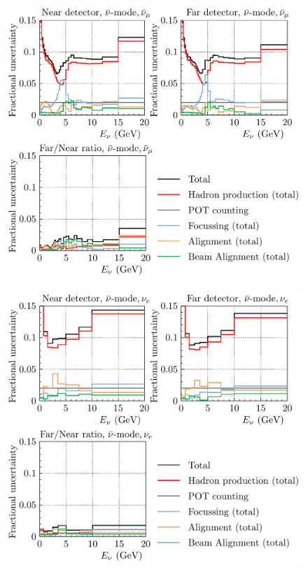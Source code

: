 \documentclass{article}
\begin{document}
\begin{figure}
  \includegraphics[width=\textwidth]{plots/fracerrs/nubarmode_numubar_ErrType}
  \caption{}
  \label{fig:grp_nubar_numubar}
\end{figure}

\begin{figure}
  \includegraphics[width=\textwidth]{plots/fracerrs/nubarmode_nue_ErrType}
  \caption{}
  \label{fig:grp_nubar_nue}
\end{figure}
\end{document}
